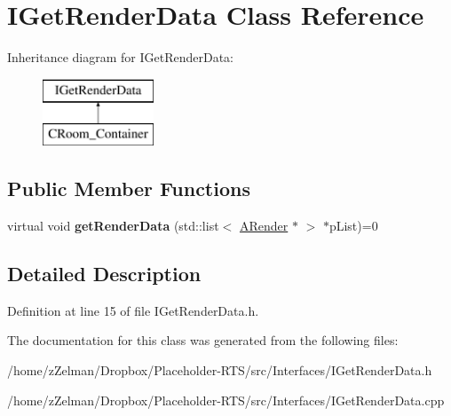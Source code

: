 \hypertarget{classIGetRenderData}{\section{I\-Get\-Render\-Data Class Reference}
\label{classIGetRenderData}
}
Inheritance diagram for I\-Get\-Render\-Data\-:\begin{figure}[H]
\begin{center}
\leavevmode
\includegraphics[height=2.000000cm]{classIGetRenderData}
\end{center}
\end{figure}
\subsection*{Public Member Functions}
\begin{DoxyCompactItemize}
\item 
\hypertarget{classIGetRenderData_aa128fd9ec5c5dc69e4db344dbba32aa2}{virtual void {\bfseries get\-Render\-Data} (std\-::list$<$ \hyperlink{classARender}{A\-Render} $\ast$ $>$ $\ast$p\-List)=0}\label{classIGetRenderData_aa128fd9ec5c5dc69e4db344dbba32aa2}

\end{DoxyCompactItemize}


\subsection{Detailed Description}


Definition at line 15 of file I\-Get\-Render\-Data.\-h.



The documentation for this class was generated from the following files\-:\begin{DoxyCompactItemize}
\item 
/home/z\-Zelman/\-Dropbox/\-Placeholder-\/\-R\-T\-S/src/\-Interfaces/I\-Get\-Render\-Data.\-h\item 
/home/z\-Zelman/\-Dropbox/\-Placeholder-\/\-R\-T\-S/src/\-Interfaces/I\-Get\-Render\-Data.\-cpp\end{DoxyCompactItemize}
